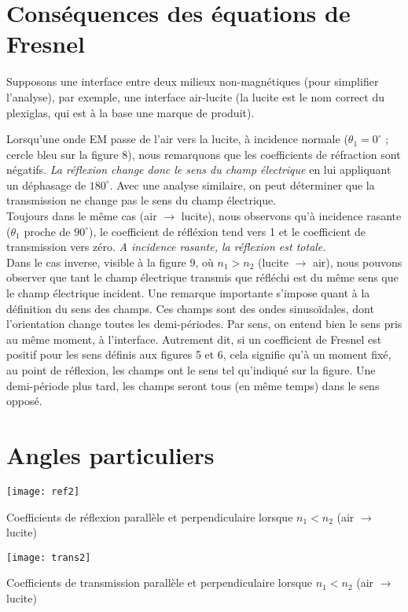 \section{Conséquences des équations de Fresnel}
Supposons une interface entre deux milieux non-magnétiques (pour simplifier l'analyse), par exemple, une interface air-lucite (la lucite est le nom correct du plexiglas, qui est à la base une marque de produit).

Lorsqu'une onde EM passe de l'air vers la lucite, à incidence normale ($\theta_1=0^\circ$ ; cercle bleu sur la figure 8), nous remarquons que les coefficients de réfraction sont négatifs. \textit{La réflexion change donc le sens du champ électrique} en lui appliquant un déphasage de $180^\circ$. Avec une analyse similaire, on peut déterminer que la transmission ne change pas le sens du champ électrique.\\
Toujours dans le même cas (air $\rightarrow$ lucite), nous observons qu'à incidence rasante ($\theta_1$ proche de $90^\circ$), le coefficient de réfléxion tend vers 1 et le coefficient de transmission vers zéro. \textit{A incidence rasante, la réflexion est totale.}\\

Dans le cas inverse, visible à la figure 9, où $n_1>n_2$ (lucite $\rightarrow$ air), nous pouvons observer que tant le champ électrique transmis que réfléchi est du même sens que le champ électrique incident. Une remarque importante s'impose quant à la définition du sens des champs. Ces champs sont des ondes sinusoïdales, dont l'orientation change toutes les demi-périodes. Par sens, on entend bien le sens pris au même moment, à l'interface. Autrement dit, si un coefficient de Fresnel est positif pour les sens définis aux figures 5 et 6, cela signifie qu'à un moment fixé, au point de réflexion, les champs ont le sens tel qu'indiqué sur la figure. Une demi-période plus tard, les champs seront tous (en même temps) dans le sens opposé. 

\section{Angles particuliers}
\begin{marginfigure}%
	\texttt{[image: ref2]}
	\caption{Coefficients de réflexion parallèle et perpendiculaire lorsque $n_1<n_2$ (air $\rightarrow$ lucite)}
\end{marginfigure} 
\begin{marginfigure}%
	\texttt{[image: trans2]}
	\caption{Coefficients de transmission parallèle et perpendiculaire lorsque $n_1<n_2$ (air $\rightarrow$ lucite)}
\end{marginfigure} 

